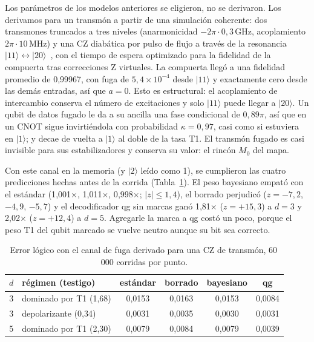 \documentclass[11pt]{article}
\begin{document}
Los parámetros de los modelos anteriores se eligieron, no se derivaron. Los derivamos para un transmón
a partir de una simulación coherente: dos transmones truncados a tres niveles (anarmonicidad
$-2\pi\cdot0{,}3$\,GHz, acoplamiento $2\pi\cdot10$\,MHz) y una CZ diabática por pulso de flujo a
través de la resonancia $|11\rangle\leftrightarrow|20\rangle$~\cite{dicarlo2009}, con el tiempo de
espera optimizado para la fidelidad de la compuerta tras correcciones Z virtuales. La compuerta llegó
a una fidelidad promedio de 0{,}99967, con fuga de $5{,}4\times10^{-4}$ desde $|11\rangle$ y exactamente
cero desde las demás entradas, así que $a=0$. Esto es estructural: el acoplamiento de intercambio
conserva el número de excitaciones y solo $|11\rangle$ puede llegar a $|20\rangle$. Un qubit de datos
fugado le da a su ancilla una fase condicional de $0{,}89\pi$, así que en un CNOT sigue invirtiéndola
con probabilidad $\kappa=0{,}97$, casi como si estuviera en $|1\rangle$; y decae de vuelta a $|1\rangle$
al doble de la tasa T1. El transmón fugado es casi invisible para sus estabilizadores y conserva su
valor: el rincón $M_0$ del mapa.

Con este canal en la memoria (y $|2\rangle$ leído como 1), se cumplieron las cuatro predicciones hechas
antes de la corrida (Tabla~\ref{tab:transmon}). El peso bayesiano empató con el estándar
(1{,}001$\times$, 1{,}011$\times$, 0{,}998$\times$; $|z|\le1{,}4$), el borrado perjudicó ($z=-7{,}2$,
$-4{,}9$, $-5{,}7$) y el decodificador qg sin marcas ganó 1{,}81$\times$ ($z=+15{,}3$) a $d=3$ y
2{,}02$\times$ ($z=+12{,}4$) a $d=5$. Agregarle la marca a qg costó un poco, porque el peso T1 del qubit
marcado se vuelve neutro aunque su bit sea correcto.

\begin{table}[t]
\centering\small
\caption{Error lógico con el canal de fuga derivado para una CZ de transmón, 60\,000 corridas por punto.}
\label{tab:transmon}
\begin{tabular}{clcccc}
\toprule
$d$ & régimen (testigo) & estándar & borrado & bayesiano & qg\\
\midrule
3 & dominado por T1 (1{,}68) & 0{,}0153 & 0{,}0163 & 0{,}0153 & 0{,}0084\\
3 & depolarizante (0{,}34) & 0{,}0031 & 0{,}0035 & 0{,}0030 & 0{,}0031\\
5 & dominado por T1 (2{,}30) & 0{,}0079 & 0{,}0084 & 0{,}0079 & 0{,}0039\\
\bottomrule
\end{tabular}
\end{table}
\end{document}
